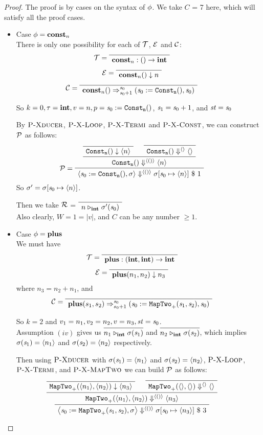 \begin{proof}

	The proof is by cases on the syntax of $\phi$.
	We take $C$ = 7 here, which will satisfy all the proof cases.
\begin{itemize}
	\item \label{thm-case-const} Case $\phi = \mathbf{const}_{n}$ \\ 	
	There is only one possibility for each of $\mathcal{T}$, $\mathcal{E}$ and $\mathcal{C}$:
	$$\MT = \PT{ \Axiom{\Typef{\constn{n}}{}{\int}}}$$
	$$\ME = \PT{\Axiom{\EvalF{\constn{n}}{}{n}}}$$
	$$\MC = \PT{\Axiom{\Transf{\constn{n}}{}{\s_0}{\s_0+1}
			{\sfun{\sdef{\s_0}{\constaf{n}}}{\s_0}}}}$$

\def\pconst{\sdef{\s_0}{\constaf{n}}}
	So $k=0,\tau = \int, v = n, p = \pconst$, $\mathit{s}_1 = \mathit{s}_0+1$, and $\mathit{st} = \mathit{s}_0$

	By $\textsc{P-Xducer}$, $\textsc{P-X-Loop}$, $\textsc{P-X-Termi}$ and $\textsc{P-X-Const}$, we can construct $\mathcal{P}$ as follows:
	$$\PT{
		\Axiom{\blockf{\consta{n}}{}{\singl{n}}}
		\Axiom{\sevalfg{\consta{n}}{}{\emptyv}{\emptyv}}
		\BC{\sevalfg{\consta{n}}{}{\vunit}{\singl{n}}}
		\LeLa{\MP = }
		\UC{\seval{\pconst}{\sgm}{\vunit}{\sgm[\s_0 \|-> \singl{n}]}{1}}			
	}$$
	So $\sgm' = \sgm[\s_0 \|-> \singl{n}]$.
	
	Then we take $\mathcal{R}$ = $\PT{\Axiom{\ValRep{n}{\int}{\sgm'(\s_0)}}}$ \\
	Also clearly, $ W = 1 = |v|$, and  $C$ can be any number $\ge 1$.
	
		
	\item \label{thm-case-plus} Case $\phi = \mathbf{plus}$ \\ 	
	We must have 
	$$\MT = \PT{\Axiom{\Typef{\plusn}{\int,\int}{\int}}}$$
	$$\ME = \PT{\Axiom{\EvalF{\plusn}{n_1,n_2}{n_3}}}$$ where $n_3 = n_2 + n_1$, and 
	$$\MC = \PT{\Axiom{\Transf{\plusn}{s_1,s_2}{\s_0}{s_0+1}
			{\sfun{\sdef{\s_0}{\maptwof{+}{\s_1}{\s_2}}}}{\s_0}}}$$

\def\pplus{\sdef{\s_0}{\maptwof{+}{\s_1}{\s_2}}}	
	So $k=2$ and $v_1= n_1, v_2= n_2, v = n_3, \mathit{st} = \mathit{s}_0$. \\
	 
	 Assumption $(iv)$ gives us
	 $\infer{\ValRep{n_1}{\int}{\sgm(\s_1)}}{}$ and 
	 $\infer{\ValRep{n_2}{\int}{\sgm(\s_2)}}{}$, which implies
	 $\sigma(\mathit{s}_1) = \langle n_1 \rangle$ and $\sigma(\mathit{s}_2) = \langle n_2 \rangle$ respectively. 
	 
	 
	 Then using $\textsc{P-Xducer}$ with $\sigma(\mathit{s}_1)= \langle n_1 \rangle$ and $ \sigma(\mathit{s}_2) = \langle n_2 \rangle$,  $\textsc{P-X-Loop}$, $\textsc{P-X-Termi}$,
	 and $\textsc{P-X-MapTwo}$ 
	 we can build $\mathcal{P}$ as follows: 
	 $$\PT{
		\Axiom{\blockf{\maptwo{+}}{\singl{n_1}, \singl{n_2}}{\singl{n_3}}}
		\Axiom{\sevalfg{\maptwo{+}}{\emptyv,\emptyv}{\emptyv}{\emptyv}}
		\BC{\sevalfg{\maptwo{+}}{\singl{n_1},\singl{n_2}}{\vunit}{\singl{n_3}}}
		\UC{\seval{\pplus}{\sgm}{\vunit}{\sgm[\s_0 \|-> \singl{n_3}]}{3}}
	 }$$  
		

\end{itemize}
\end{proof}
